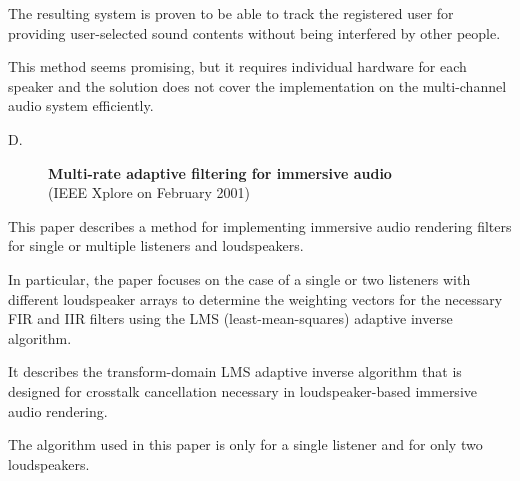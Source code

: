 \documentclass[../../../patent_v1.tex]{subfiles}
\begin{document}
The resulting system is proven to be able to track the registered user 
for providing user-selected sound contents without being interfered 
by other people.

This method seems promising, but it requires individual hardware for 
each speaker and the solution does not cover the implementation on 
the multi-channel audio system efficiently.

\begin{description}
    \item[D.]\textbf{Multi-rate adaptive filtering for immersive audio}\\(IEEE Xplore  on February 2001)
\end{description}

This paper describes a method for implementing immersive audio 
rendering filters for single or multiple listeners and loudspeakers.

In particular, the paper focuses on the case of a single or two 
listeners with different loudspeaker arrays to determine the weighting 
vectors for the necessary FIR and IIR filters using the LMS (least-mean-squares) 
adaptive inverse algorithm.

It describes the transform-domain LMS adaptive inverse algorithm that is 
designed for crosstalk cancellation necessary in loudspeaker-based 
immersive audio rendering. 

The algorithm used in this paper is only for a single listener and for
only two loudspeakers.
\end{document}
